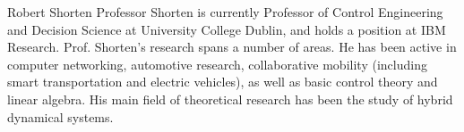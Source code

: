 \documentclass[journal]{IEEEtran}
\begin{document}
\begin{IEEEbiography}{Robert Shorten}
	Professor Shorten is currently Professor of Control Engineering and Decision Science at University College Dublin, and holds a position at IBM Research. Prof. Shorten's research spans a number of areas. He has been active in computer networking, automotive research, collaborative mobility (including smart transportation and electric vehicles), as well as basic control theory and linear algebra. His main field of theoretical research has been the study of hybrid dynamical systems.
\end{IEEEbiography}
\end{document}
